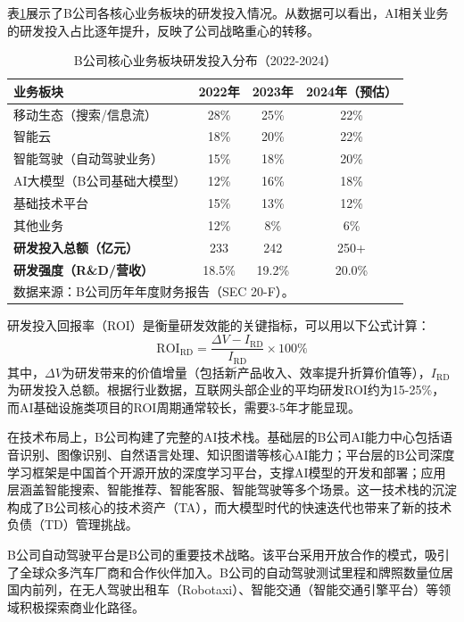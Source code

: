 表\ref{tab:baidu-rd-investment}展示了B公司各核心业务板块的研发投入情况。从数据可以看出，AI相关业务的研发投入占比逐年提升，反映了公司战略重心的转移。

\begin{table}[htbp]
\centering
\caption{B公司核心业务板块研发投入分布（2022-2024）}
\label{tab:baidu-rd-investment}
\begin{tabular}{lccc}
\toprule
\textbf{业务板块} & \textbf{2022年} & \textbf{2023年} & \textbf{2024年（预估）} \\
\midrule
移动生态（搜索/信息流） & 28\% & 25\% & 22\% \\
智能云 & 18\% & 20\% & 22\% \\
智能驾驶（自动驾驶业务） & 15\% & 18\% & 20\% \\
AI大模型（B公司基础大模型） & 12\% & 16\% & 18\% \\
基础技术平台 & 15\% & 13\% & 12\% \\
其他业务 & 12\% & 8\% & 6\% \\
\midrule
\textbf{研发投入总额（亿元）} & 233 & 242 & 250+ \\
\textbf{研发强度（R\&D/营收）} & 18.5\% & 19.2\% & 20.0\% \\
\bottomrule
\multicolumn{4}{l}{\small 数据来源：B公司历年年度财务报告（SEC 20-F）。}\\
\end{tabular}
\end{table}

研发投入回报率（ROI）是衡量研发效能的关键指标，可以用以下公式计算：
\begin{equation}
\mathrm{ROI}_{\mathrm{RD}} = \frac{\Delta V - I_{\mathrm{RD}}}{I_{\mathrm{RD}}} \times 100\%
\label{eq:rd-roi}
\end{equation}
其中，$\Delta V$为研发带来的价值增量（包括新产品收入、效率提升折算价值等），$I_{\mathrm{RD}}$为研发投入总额。根据行业数据，互联网头部企业的平均研发ROI约为15-25\%，而AI基础设施类项目的ROI周期通常较长，需要3-5年才能显现。

在技术布局上，B公司构建了完整的AI技术栈。基础层的B公司AI能力中心包括语音识别、图像识别、自然语言处理、知识图谱等核心AI能力；平台层的B公司深度学习框架是中国首个开源开放的深度学习平台，支撑AI模型的开发和部署；应用层涵盖智能搜索、智能推荐、智能客服、智能驾驶等多个场景。这一技术栈的沉淀构成了B公司核心的技术资产（TA），而大模型时代的快速迭代也带来了新的技术负债（TD）管理挑战。

B公司自动驾驶平台是B公司的重要技术战略。该平台采用开放合作的模式，吸引了全球众多汽车厂商和合作伙伴加入。B公司的自动驾驶测试里程和牌照数量位居国内前列，在无人驾驶出租车（Robotaxi）、智能交通（智能交通引擎平台）等领域积极探索商业化路径。

